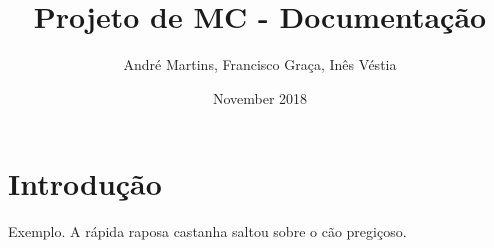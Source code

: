 \documentclass[11pt,a4paper]{article}
\begin{document}
\title{Projeto de MC - Documentação}
\author{André Martins, Francisco Graça, Inês Véstia}
\date{November 2018}
\maketitle

\section{Introdução}

Exemplo. A rápida raposa castanha saltou sobre o cão pregiçoso.
\end{document}

